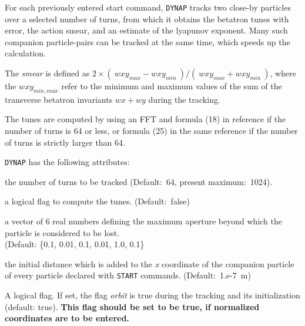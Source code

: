  
For each previously entered start command, \texttt{DYNAP} tracks two
close-by particles over a selected number of turns, from which it
obtains the betatron tunes with error, the action smear, and an estimate
of the lyapunov exponent. 
Many such companion particle-pairs can be tracked at the same time,
which speeds up the calculation. 

The \textit{smear} is 
defined as  
$2 \times (\ wxy_{max} - wxy_{min}\ ) / (\ wxy_{max} + wxy_{min}\ )$,
where the $wxy_{min,max}$ refer to the  minimum and
maximum values of the sum of the transverse betatron invariants
$wx+wy$ during the tracking. 

The tunes are computed by using an FFT and formula (18) in reference 
\cite{bartolini1995} if the number of turns is 64 or less, or formula (25) in 
the same reference if the number of turns is strictly larger than 64.
 
{\tt DYNAP} has the following attributes: 
\begin{madlist}
    the number of turns to be tracked (Default:~64,
   present maximum:~1024). 
     
    a logical flag to compute the tunes. (Default:~false)
 
    a vector of 6 real numbers defining the maximum
   aperture beyond which the particle is considered to be lost.\\
   (Default: \{0.1, 0.01, 0.1, 0.01, 1.0, 0.1\}
     
    the initial distance which is added to the
   \textit{x} coordinate of the companion particle of every particle
   declared with \texttt{START} commands. (Default:~1.e-7~m)
   
    A logical flag. If set, the flag \textit{orbit} 
   is true during the tracking and its initialization
   (default: true).
   \textbf{ This flag should be set to be true, if 
     normalized coordinates are to be entered.}
\end{madlist}


